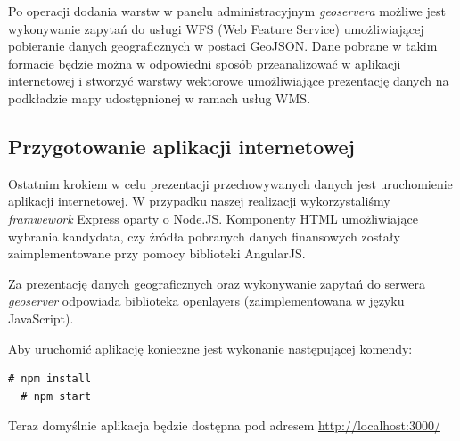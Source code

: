 \documentclass[10pt,a4paper]{article}
\begin{document}
Po operacji dodania warstw w panelu administracyjnym \textit{geoservera} możliwe jest wykonywanie zapytań do usługi WFS (Web Feature Service) umożliwiającej pobieranie danych geograficznych w postaci GeoJSON. Dane pobrane w takim formacie będzie można w odpowiedni sposób przeanalizować w aplikacji internetowej i stworzyć warstwy wektorowe umożliwiające prezentację danych na podkładzie mapy udostępnionej w ramach usług WMS.

\subsection{Przygotowanie aplikacji internetowej}
Ostatnim krokiem w celu prezentacji przechowywanych danych jest uruchomienie aplikacji internetowej. W przypadku naszej realizacji wykorzystaliśmy \textit{framwework} Express oparty o Node.JS. Komponenty HTML umożliwiające wybrania kandydata, czy źródła pobranych danych finansowych zostały zaimplementowane przy pomocy biblioteki AngularJS. 

Za prezentację danych geograficznych oraz wykonywanie zapytań do serwera \textit{geoserver} odpowiada biblioteka openlayers (zaimplementowana w języku JavaScript).

\bigskip \noindent
Aby uruchomić aplikację konieczne jest wykonanie następującej komendy:
\begin{lstlisting}[style=BashInputStyle]
  # npm install
  # npm start
\end{lstlisting}

Teraz domyślnie aplikacja będzie dostępna pod adresem \url{http://localhost:3000/}
\end{document}
